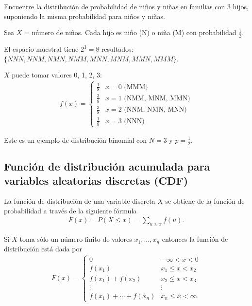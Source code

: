 \begin{ejemplo}
	\label{exmp:2.6.4}
	Encuentre la distribución de probabilidad de niños y niñas en familias con 3 hijos, suponiendo la misma probabilidad para niños y niñas.
\end{ejemplo}

\begin{solucion}
	Sea $X$ = número de niños. Cada hijo es niño (N) o niña (M) con probabilidad $\frac{1}{2}$.
	
	El espacio muestral tiene $2^3 = 8$ resultados: $\{NNN, NNM, NMN, NMM, MNN, MNM, MMN, MMM\}$.
	
	$X$ puede tomar valores 0, 1, 2, 3:
	\begin{align}
		f(x) = \begin{cases}
			\frac{1}{8} & x = 0 \text{ (MMM)} \\
			\frac{3}{8} & x = 1 \text{ (NMM, MNM, MMN)} \\
			\frac{3}{8} & x = 2 \text{ (NNM, NMN, MNN)} \\
			\frac{1}{8} & x = 3 \text{ (NNN)}
		\end{cases}
	\end{align}
	
	Este es un ejemplo de distribución binomial con $N=3$ y $p=\frac{1}{2}$.
\end{solucion}



\subsection{Función de distribución acumulada para variables aleatorias discretas (CDF)}


La función de distribución de una variable discreta $X$ se obtiene de la función de probabilidad a través de la siguiente fórmula
\begin{align}
	\label{eq:2.6.2}
	F(x) = P(X\leq x) = \sum_{u \leq x} f(u).
\end{align}



Si $X$ toma sólo un número finito de valores $x_{1},...,x_{n}$ entonces la función de distribución está dada por
\begin{align}
	\label{eq:2.6.3}
	F(x)=
	\begin{cases}
		0 & -\infty < x < 0 \\
		f(x_{1}) & x_{1} \leq x < x_{2} \\
		f(x_{1})+f(x_{2}) & x_{2} \leq x < x_{3} \\
		\vdots & \vdots \\
		f(x_{1})+\cdots+f(x_{n}) & x_{n} \leq x < \infty
	\end{cases}
\end{align}




